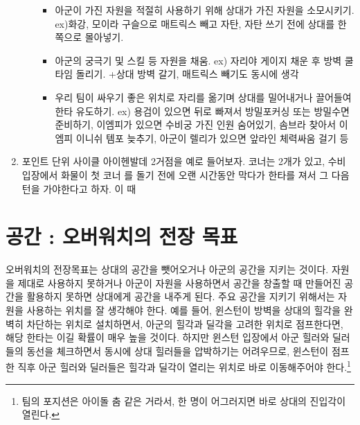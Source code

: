 \begin{enumerate}
\begin{enumerate}
\begin{itemize}
\begin{enumerate}
            \end{enumerate}
            \item 아군이 가진 자원을 적절히 사용하기 위해 상대가 가진 자원을 소모시키기. ex)화강, 모이라 구슬으로 매트릭스 빼고 자탄, 자탄 쓰기 전에 상대를 한쪽으로 몰아넣기.
            \item 아군의 궁극기 및 스킬 등 자원을 채움. ex) 자리야 게이지 채운 후 방벽 쿨타임 돌리기. +상대 방벽 갈기, 매트릭스 빼기도 동시에 생각
            \item 우리 팀이 싸우기 좋은 위치로 자리를 옮기며 상대를 밀어내거나 끌어들여 한타 유도하기. ex) 용검이 있으면 뒤로 빠져서 방밀포커싱 또는 방밀수면 준비하기, 이엠피가 있으면 수비궁 가진 인원 숨어있기, 솜브라 찾아서 이엠피 이니쉬 템포 늦추기, 아군이 렐리가 있으면 앞라인 체력싸움 걸기 등
        \end{itemize}
        
        
    \end{enumerate}
    \item 포인트 단위 사이클
    \newline 아이헨발데 2거점을 예로 들어보자. 코너는 2개가 있고, 수비 입장에서 화물이 첫 코너 를 돌기 전에 오랜 시간동안 막다가 한타를 져서 그 다음 턴을 가야한다고 하자. 이 때 
\end{enumerate}

\section{공간 : 오버워치의 전장 목표}
오버워치의 전장목표는 상대의 공간을 뺏어오거나 아군의 공간을 지키는 것이다. 자원을 제대로 사용하지 못하거나 아군이 자원을 사용하면서 공간을 창출할 때 만들어진 공간을 활용하지 못하면 상대에게 공간을 내주게 된다. 주요 공간을 지키기 위해서는 자원을 사용하는 위치를 잘 생각해야 한다. 예를 들어, 윈스턴이 방벽을 상대의 힐각을 완벽히 차단하는 위치로 설치하면서, 아군의 힐각과 딜각을 고려한 위치로 점프한다면, 해당 한타는 이길 확률이 매우 높을 것이다. 하지만 윈스턴 입장에서 아군 힐러와 딜러들의 동선을 체크하면서 동시에 상대 힐러들을 압박하기는 어려우므로, 윈스턴이 점프한 직후 아군 힐러와 딜러들은 힐각과 딜각이 열리는 위치로 바로 이동해주어야 한다.\footnote{팀의 포지션은 아이돌 춤 같은 거라서, 한 명이 어그러지면 바로 상대의 진입각이 열린다.}
